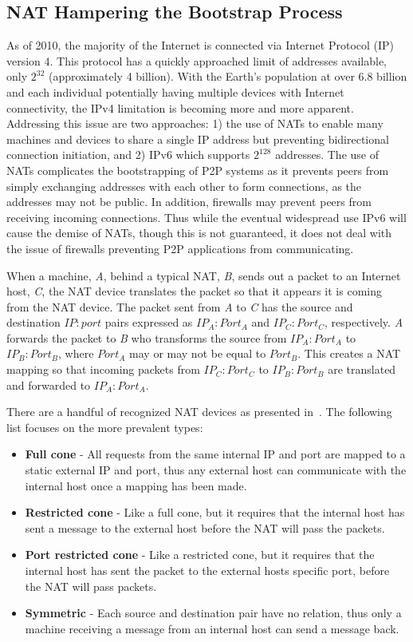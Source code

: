 \documentclass[conference]{IEEEtran}
\begin{document}
\subsection{NAT Hampering the Bootstrap Process}

As of 2010, the majority of the Internet is connected via Internet Protocol
(IP) version 4.  This protocol has a quickly approached limit of addresses
available,  only $2^{32}$ (approximately 4 billion).  With the Earth's
population at over 6.8 billion and each individual potentially having multiple
devices with Internet connectivity, the IPv4 limitation is becoming more and
more apparent.  Addressing this issue are two approaches:  1) the use of NATs
to enable many machines and devices to share a single IP address but preventing
bidirectional connection initiation, and 2) IPv6 which supports $2^{128}$
addresses.  The use of NATs complicates the bootstrapping of P2P systems as it
prevents peers from simply exchanging addresses with each other to form
connections, as the addresses may not be public.  In addition, firewalls may
prevent peers from receiving incoming connections.  Thus while the eventual
widespread use IPv6 will cause the demise of NATs, though this is not
guaranteed, it does not deal with the issue of firewalls preventing P2P
applications from communicating.

When a machine, \textit{A}, behind a typical NAT, \textit{B}, sends out a
packet to an Internet host, \textit{C}, the NAT device translates the packet so
that it appears it is coming from the NAT device.  The packet sent from
\textit{A} to \textit{C} has the source and destination $IP:port$ pairs
expressed as $IP_A:Port_A$ and $IP_C:Port_C$, respectively.  \textit{A}
forwards the packet to \textit{B} who transforms the source from $IP_A:Port_A$
to $IP_B:Port_B$, where $Port_A$ may or may not be equal to $Port_B$.  This
creates a NAT mapping so that incoming packets from $IP_C:Port_C$ to
$IP_B:Port_B$ are translated and forwarded to $IP_A:Port_A$.

There are a handful of recognized NAT devices as presented in~\cite{stun,
p2p_nats_rfc}.  The following list focuses on the more prevalent types:
\begin{itemize}
\item \textbf{Full cone} - All requests from the same internal IP and port are
mapped to a static external IP and port, thus any external host can communicate
with the internal host once a mapping has been made.
\item \textbf{Restricted cone} - Like a full cone, but it requires that the
internal host has sent a message to the external host before the NAT will pass
the packets.
\item \textbf{Port restricted cone} - Like a restricted cone, but it requires
that the internal host has sent the packet to the external hosts specific port,
before the NAT will pass packets.
\item \textbf{Symmetric} - Each source and destination pair have no relation,
thus only a machine receiving a message from an internal host can send a
message back.
\end{itemize}
\end{document}
